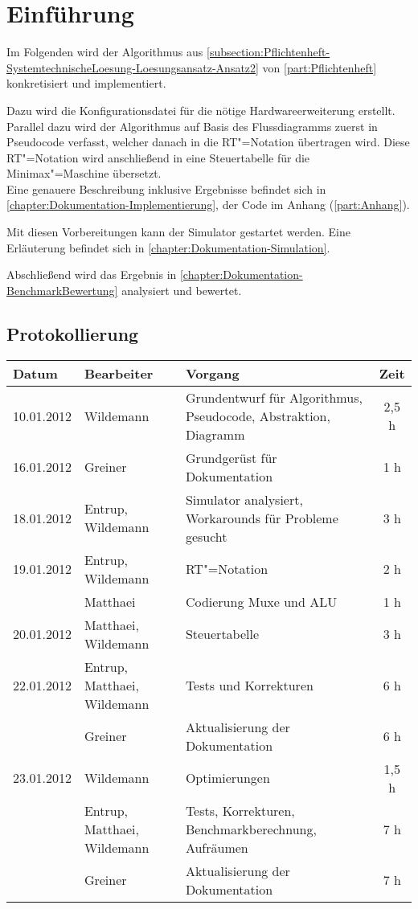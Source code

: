 \chapter{Einführung}
\label{chapter:Dokumentation-Einfuehrung}

Im Folgenden wird der Algorithmus aus \autoref{subsection:Pflichtenheft-SystemtechnischeLoesung-Loesungsansatz-Ansatz2} von \autoref{part:Pflichtenheft} konkretisiert und implementiert.

Dazu wird die Konfigurationsdatei für die nötige Hardwareerweiterung erstellt. Parallel dazu wird der Algorithmus auf Basis des Flussdiagramms zuerst in Pseudocode verfasst, welcher danach in die RT"=Notation übertragen wird. Diese RT"=Notation wird anschließend in eine Steuertabelle für die Minimax"=Maschine übersetzt.\\
Eine genauere Beschreibung inklusive Ergebnisse befindet sich in \autoref{chapter:Dokumentation-Implementierung}, der Code im Anhang (\autoref{part:Anhang}).

Mit diesen Vorbereitungen kann der Simulator gestartet werden. Eine Erläuterung befindet sich in \autoref{chapter:Dokumentation-Simulation}.

Abschließend wird das Ergebnis in \autoref{chapter:Dokumentation-BenchmarkBewertung} analysiert und bewertet.

\newpage

\section{Protokollierung}
\label{section:Dokumentation-Einfuehrung-Protokollierung}

\begin{tabularx}{\textwidth}{|l|l|X|c|}
    \hline
    Datum & Bearbeiter & Vorgang & Zeit \\
    \hline
    \hline
    10.01.2012 & Wildemann & Grundentwurf für Algorithmus, Pseudocode, Abstraktion, Diagramm & 2,5 h \\
    \hline
    16.01.2012 & Greiner & Grundgerüst für Dokumentation & 1 h \\
    \hline
    18.01.2012 & Entrup, Wildemann & Simulator analysiert, Workarounds für Probleme gesucht & 3 h \\
    \hline
    19.01.2012 & Entrup, Wildemann & RT"=Notation & 2 h\\
               & Matthaei & Codierung Muxe und ALU & 1 h\\
    \hline
    20.01.2012 & Matthaei, Wildemann & Steuertabelle & 3 h\\
    \hline
    22.01.2012 & Entrup, Matthaei, Wildemann & Tests und Korrekturen & 6 h\\
               & Greiner & Aktualisierung der Dokumentation & 6 h \\
    \hline
    23.01.2012 & Wildemann & Optimierungen & 1,5 h \\
               & Entrup, Matthaei, Wildemann & Tests, Korrekturen, Benchmarkberechnung, Aufräumen & 7 h \\
               & Greiner & Aktualisierung der Dokumentation & 7 h \\
    \hline
\end{tabularx}
